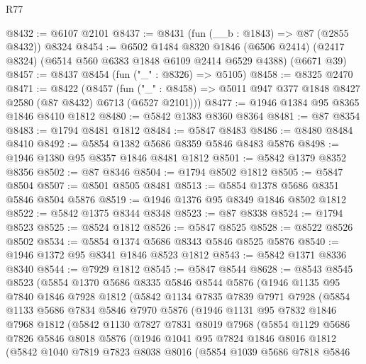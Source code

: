 \begin{lexlean}{R77}
\begin{coremodule}
@8432 := @6107 @2101
@8437 := @8431 (fun (__b : @1843) => @87 (@2855 @8432)) @8324
@8454 := @6502
    @1484
    @8320
    @1846
    (@6506 @2414)
    (@2417 @8324)
    (@6514 @560 @6383 @1848 @6109 @2414 @6529 @4388)
    (@6671 @39)
@8457 := @8437 @8454 (fun ("_" : @8326) => @5105)
@8458 := @8325 @2470
@8471 := @8422
    (@8457 (fun ("_" : @8458) => @5011 @947 @377 @1848 @8427 @2580 (@87 @8432) @6713 (@6527 @2101)))
@8477 := @1946 @1384 @95 @8365 @1846 @8410 @1812
@8480 := @5842 @1383 @8360 @8364
@8481 := @87 @8354
@8483 := @1794 @8481 @1812
@8484 := @5847 @8483
@8486 := @8480 @8484 @8410
@8492 := @5854 @1382 @5686 @8359 @5846 @8483 @5876
@8498 := @1946 @1380 @95 @8357 @1846 @8481 @1812
@8501 := @5842 @1379 @8352 @8356
@8502 := @87 @8346
@8504 := @1794 @8502 @1812
@8505 := @5847 @8504
@8507 := @8501 @8505 @8481
@8513 := @5854 @1378 @5686 @8351 @5846 @8504 @5876
@8519 := @1946 @1376 @95 @8349 @1846 @8502 @1812
@8522 := @5842 @1375 @8344 @8348
@8523 := @87 @8338
@8524 := @1794 @8523
@8525 := @8524 @1812
@8526 := @5847 @8525
@8528 := @8522 @8526 @8502
@8534 := @5854 @1374 @5686 @8343 @5846 @8525 @5876
@8540 := @1946 @1372 @95 @8341 @1846 @8523 @1812
@8543 := @5842 @1371 @8336 @8340
@8544 := @7929 @1812
@8545 := @5847 @8544
@8628 := @8543
    @8545
    @8523
    (@5854
      @1370
      @5686
      @8335
      @5846
      @8544
      @5876
      (@1946
        @1135
        @95
        @7840
        @1846
        @7928
        @1812
        (@5842
          @1134
          @7835
          @7839
          @7971
          @7928
          (@5854
            @1133
            @5686
            @7834
            @5846
            @7970
            @5876
            (@1946
              @1131
              @95
              @7832
              @1846
              @7968
              @1812
              (@5842
                @1130
                @7827
                @7831
                @8019
                @7968
                (@5854
                  @1129
                  @5686
                  @7826
                  @5846
                  @8018
                  @5876
                  (@1946
                    @1041
                    @95
                    @7824
                    @1846
                    @8016
                    @1812
                    (@5842
                      @1040
                      @7819
                      @7823
                      @8038
                      @8016
                      (@5854
                        @1039
                        @5686
                        @7818
                        @5846

\end{coremodule}
\end{lexlean}
